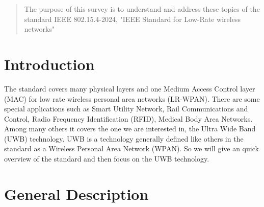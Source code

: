 \documentclass[conference]{IEEEtran}
\begin{document}




\maketitle

\begin{abstract}
The purpose of this survey is to understand and address these topics of the standard IEEE 802.15.4-2024,
"IEEE Standard for Low-Rate wireless networks"
\end{abstract}





%
\IEEEpeerreviewmaketitle



\section{Introduction}
The standard\cite{10794632} covers many physical layers and one Medium Access Control layer (MAC) for 
low rate wireless personal area networks (LR-WPAN).
There are some special applications such as Smart Utility Network, 
Rail Communications and Control, Radio Frequency Identification (RFID),
Medical Body Area Networks. Among many others it covers the one we are interested in,
the Ultra Wide Band (UWB) technology.
UWB is a technology generally defined like others in the standard\cite{10794632} as a Wireless Personal Area Network 
(WPAN). So we will give an quick overview of the standard\cite{10794632} and then focus on the UWB technology.

% 

\section{General Description}
\end{document}
